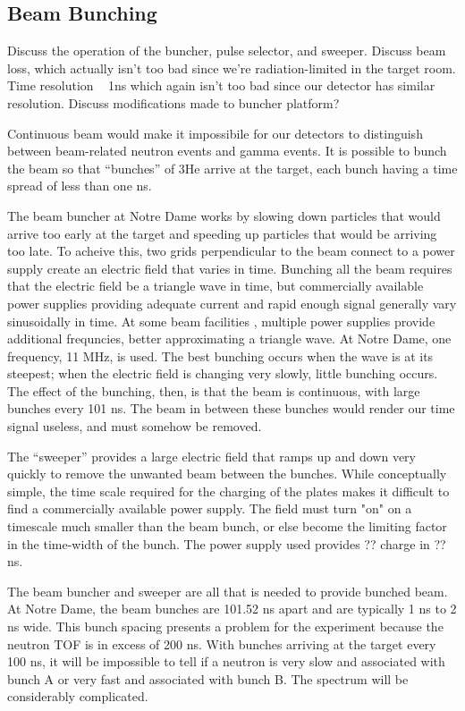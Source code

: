 
\subsection{Beam Bunching}
Discuss the operation of the buncher, pulse selector, and sweeper.  Discuss beam loss, which actually isn't too bad since we're radiation-limited in the target room.
Time resolution ~ 1ns which again isn't too bad since our detector has similar resolution.
Discuss modifications made to buncher platform?

Continuous beam would make it impossibile for our detectors to distinguish between beam-related neutron events and gamma events.  It is possible to bunch the beam so that ``bunches'' of 3He arrive at the target, each bunch having a time spread of less than one ns.  

The beam buncher at Notre Dame works by slowing down particles that would arrive too early at the target and speeding up particles that would be arriving too late.  To acheive this, two grids perpendicular to the beam connect to a power supply create an electric field that varies in time.  Bunching all the beam requires that the electric field be a triangle wave in time, but commercially available power supplies providing adequate current and rapid enough signal generally vary sinusoidally in time.  At some beam facilities \cite{LynchBunching}, multiple power supplies provide additional frequncies, better approximating a triangle wave.  At Notre Dame, one frequency, 11 MHz, is used.  The best bunching occurs when the wave is at its steepest; when the electric field is changing very slowly, little bunching occurs.  The effect of the bunching, then, is that the beam is continuous, with large bunches every 101 ns.  The beam in between these bunches would render our time signal useless, and must somehow be removed.

The ``sweeper'' provides a large electric field that ramps up and down very quickly to remove the unwanted beam between the bunches.  While conceptually simple, the time scale required for the charging of the plates makes it difficult to find a commercially available power supply.  The field must turn "on" on a timescale much smaller than the beam bunch, or else become the limiting factor in the time-width of the bunch.  The power supply used provides ?? charge in ?? ns.


The beam buncher and sweeper are all that is needed to provide bunched beam.  At Notre Dame, the beam bunches are 101.52 ns apart and are typically 1 ns to 2 ns wide.  This bunch spacing presents a problem for the experiment because the neutron TOF is in excess of 200 ns.  With bunches arriving at the target every 100 ns, it will be impossible to tell if a neutron is very slow and associated with bunch A or very fast and associated with bunch B.  The spectrum will be considerably complicated.

